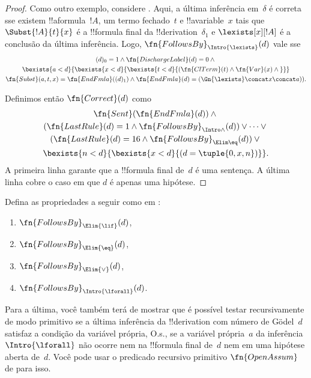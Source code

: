 \documentclass[../../../include/open-logic-section]{subfiles}
\begin{document}
\begin{proof}
  Como outro exemplo, considere \Intro{\lexists}. Aqui, a última
  inferência em~$\delta$ é correta sse existem !!a{formula}~$!A$, um
  termo fechado~$t$ e !!a{variable}~$x$ tais que $\Subst{!A}{t}{x}$ é
  a !!{formula} final da !!{derivation}~$\delta_1$ e
  $\lexists[x][!A]$ é a conclusão da última inferência. Logo,
  $\fn{FollowsBy}_{\Intro{\lexists}}(d)$ vale sse
  \begin{multline*}
    (d)_0 = 1 \land \fn{DischargeLabel}(d) = 0 \land {} \\
    \bexists{a < d}{\bexists{x<d}{\bexists{t<d}{
          (\fn{ClTerm}(t) \land \fn{Var}(x)  \land {}}}}\\
    \fn{Subst}(a,t,x) = \fn{EndFmla}((d)_1) \land
    \fn{EndFmla}(d) = (\Gn{\lexists} \concat x \concat a)).
  \end{multline*}

  Definimos então $\fn{Correct}(d)$ como
  \begin{multline*}
    \fn{Sent}(\fn{EndFmla}(d)) \land {}\\
    (\fn{LastRule}(d) = 1 \land
    \fn{FollowsBy}_{\Intro\land}(d)) \lor \dots \lor {}\\
    (\fn{LastRule}(d) = 16 \land \fn{FollowsBy}_{\Elim\eq}(d)) \lor {}\\
    \bexists{n<d}{\bexists{x<d}{(d = \tuple{0, x, n})}}.
  \end{multline*}
  A primeira linha garante que a !!{formula} final de~$d$ é uma
  sentença. A última linha cobre o caso em que $d$ é apenas uma
  hipótese.
\end{proof}

\begin{prob}
  Defina as propriedades a seguir como em
  :
  \begin{enumerate}
  \item $\fn{FollowsBy}_{\Elim{\lif}}(d)$,
  \item $\fn{FollowsBy}_{\Elim{\eq}}(d)$,
  \item $\fn{FollowsBy}_{\Elim{\lor}}(d)$,
  \item $\fn{FollowsBy}_{\Intro{\lforall}}(d)$.
  \end{enumerate}
  Para a última, você também terá de mostrar que é possível testar
  recursivamente de modo primitivo se a última inferência da
  !!{derivation} com número de G\"odel~$d$ satisfaz a condição da
  variável própria, O.s.\@, se a variável própria~$a$ da inferência
  $\Intro{\lforall}$ não ocorre nem na !!{formula} final de~$d$ nem em
  uma hipótese aberta de~$d$. Você pode usar o predicado recursivo
  primitivo $\fn{OpenAssum}$ de
   para isso.
\end{prob}
\end{document}
